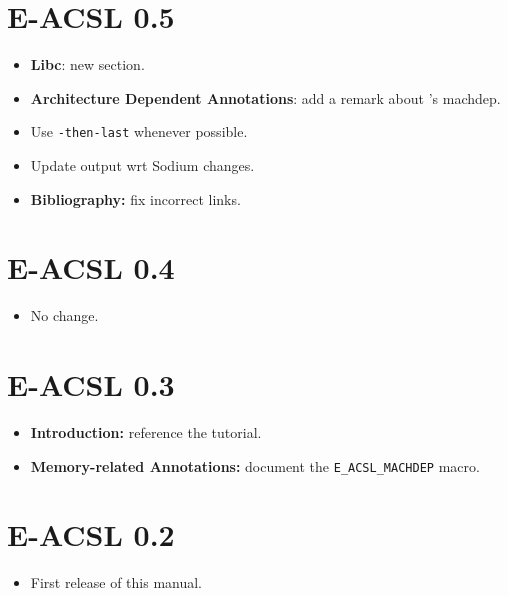 \section*{E-ACSL 0.5}

\begin{itemize}
\item \textbf{Libc}: new section.
\item \textbf{Architecture Dependent Annotations}: add a remark about \gcc's
  machdep.
\item Use \texttt{-then-last} whenever possible.
\item Update output wrt \framac Sodium changes.
\item \textbf{Bibliography:} fix incorrect links.
\end{itemize}

\section*{E-ACSL 0.4}

\begin{itemize}
\item No change.
\end{itemize}

\section*{E-ACSL 0.3}
\begin{itemize}
\item \textbf{Introduction:} reference the \eacsl tutorial.
\item \textbf{Memory-related Annotations:} document the
  \lstinline|E_ACSL_MACHDEP| macro.
\end{itemize}

\section*{E-ACSL 0.2}

\begin{itemize}
\item First release of this manual.
\end{itemize}
